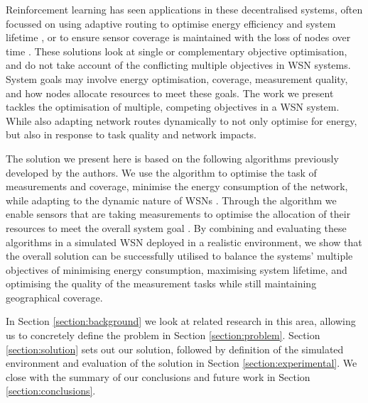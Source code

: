\ifdefined\DEBUG {} \else \fi
Reinforcement learning has seen applications in these decentralised systems, often focussed on using adaptive routing  to optimise energy efficiency and system lifetime \citep{ 10.1504/IJCNDS.2012.048871, Kulkarnib}, or to ensure sensor coverage is maintained with the loss of nodes over time \citep{Sharma2020}. These solutions look at single or complementary objective optimisation, and do not take account of the conflicting multiple objectives in WSN systems. System goals may involve energy optimisation, coverage, measurement quality, and how nodes allocate resources to meet these goals. The work we present tackles the optimisation of multiple, competing objectives in a WSN system. While also adapting network routes dynamically to not only optimise for energy, but also in response to task quality and network impacts.

\ifdefined\DEBUG {} \else \fi
The solution we present here is based on the following algorithms previously developed by the authors. We use the \acronymATARIA{}{} algorithm to optimise the task of measurements and coverage, minimise the energy consumption of the network, while adapting to the dynamic nature of WSNs \citep{creech2021dynamic}. Through the \acronymMGRAO{}{} algorithm we enable sensors that are taking measurements to optimise the allocation of their resources to meet the overall system goal \citep{creech2021resource}. By combining and evaluating these algorithms in a simulated WSN deployed in a realistic environment, we show that the overall solution can be successfully utilised to balance the systems' multiple objectives of minimising energy consumption, maximising system lifetime, and optimising the quality of the measurement tasks while still maintaining geographical coverage.

\ifdefined\DEBUG {} \else \fi
In Section \ref{section:background} we look at related research in this area, allowing us to concretely define the problem in Section \ref{section:problem}. Section \ref{section:solution} sets out our solution, followed by definition of the simulated environment and evaluation of the solution in Section \ref{section:experimental}. We close with the summary of our conclusions and future work in Section \ref{section:conclusions}.
